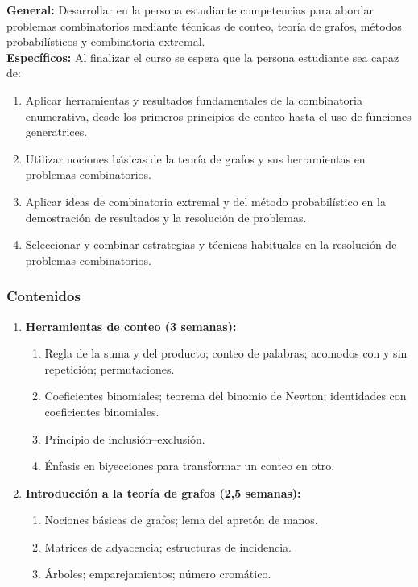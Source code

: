 \begin{refsection}
\textbf{General:} Desarrollar en la persona estudiante competencias para abordar problemas combinatorios mediante técnicas de conteo, teoría de grafos, métodos probabilísticos y combinatoria extremal. \\

\textbf{Específicos:} Al finalizar el curso se espera que la persona estudiante sea capaz de:

\begin{enumerate}
\item Aplicar herramientas y resultados fundamentales de la combinatoria enumerativa, desde los primeros principios de conteo hasta el uso de funciones generatrices.
\item Utilizar nociones básicas de la teoría de grafos y sus herramientas en problemas combinatorios.
\item Aplicar ideas de combinatoria extremal y del método probabilístico en la demostración de resultados y la resolución de problemas.
\item Seleccionar y combinar estrategias y técnicas habituales en la resolución de problemas combinatorios.
\end{enumerate}

\subsubsection*{Contenidos}

\begin{enumerate}
\item \textbf{Herramientas de conteo (3 semanas):}
\begin{enumerate}
    \item Regla de la suma y del producto; conteo de palabras; acomodos con y sin repetición; permutaciones.
    \item Coeficientes binomiales; teorema del binomio de Newton; identidades con coeficientes binomiales.
    \item Principio de inclusión--exclusión.
    \item Énfasis en biyecciones para transformar un conteo en otro.
\end{enumerate}

\item \textbf{Introducción a la teoría de grafos (2{,}5 semanas):}
\begin{enumerate}
    \item Nociones básicas de grafos; lema del apretón de manos.
    \item Matrices de adyacencia; estructuras de incidencia.
    \item Árboles; emparejamientos; número cromático.
\end{enumerate}


\end{enumerate}
\end{refsection}
